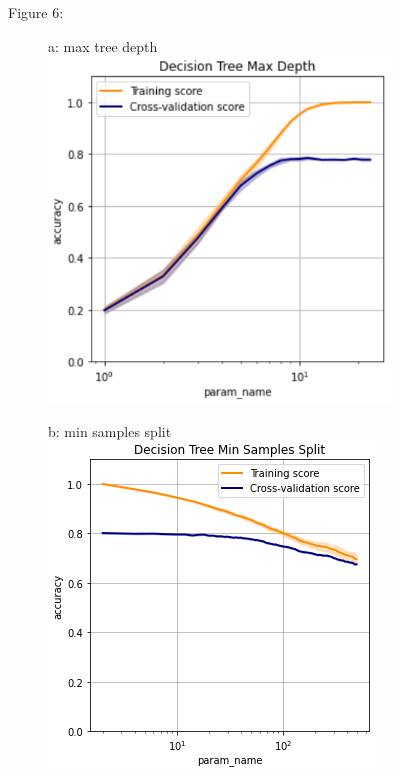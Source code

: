 \documentclass{article}
\begin{document}
\begin{figure}
	\centering
	Figure 6:\\
	\begin{subfigure}{.24\textwidth}
		\centering
		a: max tree depth\\
		\includegraphics[width=\linewidth]{mnist_decision_max_depth.png}
		
	\end{subfigure}
	\begin{subfigure}{.24\textwidth}
		\centering
		b: min samples split\\
		\includegraphics[width=\linewidth]{mnist_decision_min_samples_split.png}
		

\end{subfigure}
\end{figure}
\end{document}
